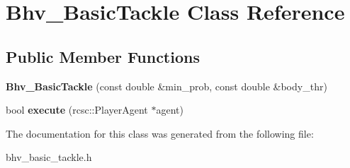 \hypertarget{classBhv__BasicTackle}{
\section{Bhv\_\-BasicTackle Class Reference}
\label{classBhv__BasicTackle}
}
\subsection*{Public Member Functions}
\begin{DoxyCompactItemize}
\item 
\hypertarget{classBhv__BasicTackle_ad6b1cf773fd97829ec3cb52d94d82035}{
{\bfseries Bhv\_\-BasicTackle} (const double \&min\_\-prob, const double \&body\_\-thr)}
\label{classBhv__BasicTackle_ad6b1cf773fd97829ec3cb52d94d82035}

\item 
\hypertarget{classBhv__BasicTackle_abc024fa4b11cba1de15fa6185c4f14d5}{
bool {\bfseries execute} (rcsc::PlayerAgent $\ast$agent)}
\label{classBhv__BasicTackle_abc024fa4b11cba1de15fa6185c4f14d5}

\end{DoxyCompactItemize}


The documentation for this class was generated from the following file:\begin{DoxyCompactItemize}
\item 
bhv\_\-basic\_\-tackle.h\end{DoxyCompactItemize}
